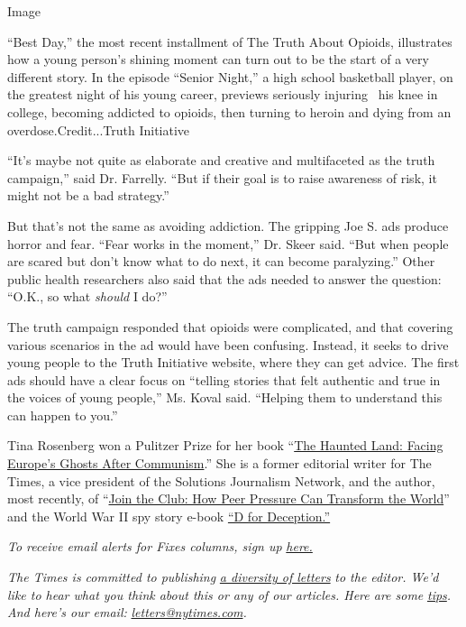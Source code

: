 Image

``Best Day,'' the most recent installment of The Truth About Opioids,
illustrates how a young person's shining moment can turn out to be the
start of a very different story. In the episode ``Senior Night,'' a high
school basketball player, on the greatest night of his young career,
previews seriously injuring~ his knee in college, becoming addicted to
opioids, then turning to heroin and dying from an
overdose.Credit...Truth Initiative

``It's maybe not quite as elaborate and creative and multifaceted as the
truth campaign,'' said Dr. Farrelly. ``But if their goal is to raise
awareness of risk, it might not be a bad strategy.''

But that's not the same as avoiding addiction. The gripping Joe S. ads
produce horror and fear. ``Fear works in the moment,'' Dr. Skeer said.
``But when people are scared but don't know what to do next, it can
become paralyzing.'' Other public health researchers also said that the
ads needed to answer the question: ``O.K., so what \emph{should} I do?''

The truth campaign responded that opioids were complicated, and that
covering various scenarios in the ad would have been confusing. Instead,
it seeks to drive young people to the Truth Initiative website, where
they can get advice. The first ads should have a clear focus on
``telling stories that felt authentic and true in the voices of young
people,'' Ms. Koval said. ``Helping them to understand this can happen
to you.''

Tina Rosenberg won a Pulitzer Prize for her book
``\href{http://www.randomhouse.com/catalog/display.pperl?isbn=9780679744993}{The
Haunted Land: Facing Europe's Ghosts After Communism}.'' She is a former
editorial writer for The Times, a vice president of the Solutions
Journalism Network, and the author, most recently, of
``\href{http://books.wwnorton.com/books/Join-the-Club}{Join the Club:
How Peer Pressure Can Transform the World}'' and the World War II spy
story e-book
\href{https://www.goodreads.com/book/show/16124470-d-for-deception}{``D
for Deception.''}

\emph{To receive email alerts for Fixes columns, sign up}
\href{http://eepurl.com/ABIxL}{\emph{here.}}

\emph{The Times is committed to publishing}
\href{https://www.nytimes.com/2019/01/31/opinion/letters/letters-to-editor-new-york-times-women.html}{\emph{a
diversity of letters}} \emph{to the editor. We'd like to hear what you
think about this or any of our articles. Here are some}
\href{https://help.nytimes.com/hc/en-us/articles/115014925288-How-to-submit-a-letter-to-the-editor}{\emph{tips}}\emph{.
And here's our email:}
\href{mailto:letters@nytimes.com}{\emph{letters@nytimes.com}}\emph{.}


